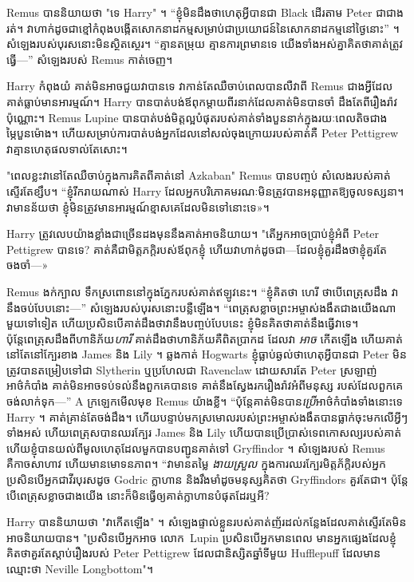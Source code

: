 \later

Remus បាននិយាយថា "ទេ Harry" ។ “ខ្ញុំមិនដឹងថាហេតុអ្វីបានជា Black ដើរតាម Peter ជាជាងរត់។ វាហាក់ដូចជាខ្មៅកំពុងបង្កើតសោកនាដកម្មសម្រាប់ជាប្រយោជន៍នៃសោកនាដកម្មនៅថ្ងៃនោះ” ។ សំឡេង​របស់​បុរស​នោះ​មិន​ស្ថិតស្ថេរ។ “គ្មាន​តម្រុយ គ្មាន​ការ​ព្រមាន​ទេ យើង​ទាំង​អស់​គ្នា​គិត​ថា​គាត់​ត្រូវ​ធ្វើ—” សំឡេង​របស់ Remus កាត់​ចេញ។

Harry កំពុងយំ គាត់មិនអាចជួយវាបានទេ វាកាន់តែឈឺចាប់ពេលបានលឺវាពី Remus ជាងអ្វីដែលគាត់ធ្លាប់មានអារម្មណ៍។ Harry បាន​បាត់​បង់​ឪពុក​ម្តាយ​ពីរ​នាក់​ដែល​គាត់​មិន​បាន​ចាំ ដឹង​តែ​ពី​រឿង​រ៉ាវ​ប៉ុណ្ណោះ។ Remus Lupine បានបាត់បង់មិត្តល្អបំផុតរបស់គាត់ទាំងបួននាក់ក្នុងរយៈពេលតិចជាងម្ភៃបួនម៉ោង។ ហើយសម្រាប់ការបាត់បង់អ្នកដែលនៅសល់ចុងក្រោយរបស់គាត់គឺ Peter Pettigrew វាគ្មានហេតុផលទាល់តែសោះ។

"ពេលខ្លះវានៅតែឈឺចាប់ក្នុងការគិតពីគាត់នៅ Azkaban" Remus បានបញ្ចប់ សំលេងរបស់គាត់ស្ទើរតែខ្សឹប។ “ខ្ញុំ​រីករាយ​ណាស់ Harry ដែល​អ្នក​បរិភោគ​មរណៈ​មិន​ត្រូវ​បាន​អនុញ្ញាត​ឱ្យ​ចូល​ទស្សនា។ វា​មាន​ន័យ​ថា ខ្ញុំ​មិន​ត្រូវ​មាន​អារម្មណ៍​ខ្មាស​គេ​ដែល​មិន​ទៅ​នោះ​ទេ»។

Harry ត្រូវ​លេប​យ៉ាង​ខ្លាំង​ជាច្រើន​ដង​មុន​នឹង​គាត់​អាច​និយាយ។ "តើអ្នកអាចប្រាប់ខ្ញុំអំពី Peter Pettigrew បានទេ? គាត់​គឺ​ជា​មិត្ត​ភក្តិ​របស់​ឪពុក​ខ្ញុំ ហើយ​វា​ហាក់​ដូចជា—ដែល​ខ្ញុំ​គួរ​ដឹង​ថា​ខ្ញុំ​គួរ​តែ​ចងចាំ—»

Remus ងក់ក្បាល ទឹកស្រពោននៅក្នុងភ្នែករបស់គាត់ឥឡូវនេះ។ “ខ្ញុំគិតថា ហេរី ថាបើពេត្រុសដឹង វានឹងចប់បែបនោះ—” សំឡេងរបស់បុរសនោះបន្លឺឡើង។ “ពេត្រុស​ខ្លាច​ព្រះអម្ចាស់​ងងឹត​ជាង​យើង​ណា​មួយ​ទៅ​ទៀត ហើយ​ប្រសិន​បើ​គាត់​ដឹង​ថា​វា​នឹង​បញ្ចប់​បែប​នេះ ខ្ញុំ​មិន​គិត​ថា​គាត់​នឹង​ធ្វើ​វា​ទេ។ ប៉ុន្តែពេត្រុសដឹងពីហានិភ័យ\emph{ហារី} គាត់ដឹងថាហានិភ័យគឺពិតប្រាកដ ដែលវា \emph{អាច} កើតឡើង ហើយគាត់នៅតែនៅក្បែរខាង James និង Lily ។ ឆ្លងកាត់ Hogwarts ខ្ញុំធ្លាប់ឆ្ងល់ថាហេតុអ្វីបានជា Peter មិនត្រូវបានតម្រៀបទៅជា Slytherin ឬប្រហែលជា Ravenclaw ដោយសារតែ Peter ស្រឡាញ់អាថ៌កំបាំង គាត់មិនអាចទប់ទល់នឹងពួកគេបានទេ គាត់នឹងស្វែងរករឿងរ៉ាវអំពីមនុស្ស របស់ដែលពួកគេចង់លាក់ទុក—” A ក្រឡេកមើលមុខ Remus យ៉ាងខ្លី។ “ប៉ុន្តែគាត់មិនបាន\emph{ប្រើ}អាថ៌កំបាំងទាំងនោះទេ Harry ។ គាត់គ្រាន់តែចង់ដឹង។ ហើយបន្ទាប់មកស្រមោលរបស់ព្រះអម្ចាស់ងងឹតបានធ្លាក់ចុះមកលើអ្វីៗទាំងអស់ ហើយពេត្រុសបានឈរក្បែរ James និង Lily ហើយបានប្រើប្រាស់ទេពកោសល្យរបស់គាត់ ហើយខ្ញុំបានយល់ពីមូលហេតុដែលមួកបានបញ្ជូនគាត់ទៅ Gryffindor ។ សំឡេងរបស់ Remus គឺកាចសាហាវ ហើយមានមោទនភាព។ “វាមានតម្លៃ \emph{ងាយស្រួល} ក្នុងការឈរក្បែរមិត្តភ័ក្តិរបស់អ្នក ប្រសិនបើអ្នកជាវីរបុរសដូច Godric ក្លាហាន និងរឹងមាំដូចមនុស្សគិតថា Gryffindors គួរតែជា។ ប៉ុន្តែ បើ​ពេត្រុស​ខ្លាច​ជាង​យើង នោះ​ក៏​មិន​ធ្វើ​ឲ្យ​គាត់​ក្លាហាន​បំផុត​ដែរ​ឬ​អី?

Harry បាននិយាយថា "វាកើតឡើង" ។ សំឡេង​ផ្ទាល់​ខ្លួន​របស់​គាត់​ញ័រ​ដល់​កន្លែង​ដែល​គាត់​ស្ទើរតែ​មិន​អាច​និយាយ​បាន។ "ប្រសិនបើអ្នកអាច លោក~Lupin ប្រសិនបើអ្នកមានពេល មានអ្នកផ្សេងដែលខ្ញុំគិតថាគួរតែស្តាប់រឿងរបស់ Peter Pettigrew ដែលជានិស្សិតឆ្នាំទីមួយ Hufflepuff ដែលមានឈ្មោះថា Neville Longbottom"។

